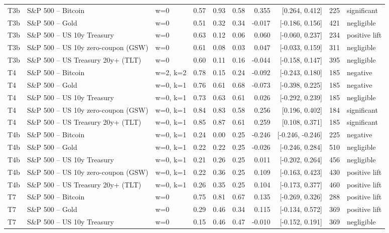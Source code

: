 \begin{figure}
\begin{tabular}{lllrrrrrrl}
T3b & S\&P 500 -- Bitcoin & w=0 & 0.57 & 0.93 & 0.58 & 0.355 & [0.264, 0.412] & 225 & significant \\
T3b & S\&P 500 -- Gold & w=0 & 0.51 & 0.32 & 0.34 & -0.017 & [-0.186, 0.156] & 421 & negligible \\
T3b & S\&P 500 -- US 10y Treasury & w=0 & 0.63 & 0.12 & 0.06 & 0.060 & [-0.060, 0.237] & 234 & positive lift \\
T3b & S\&P 500 -- US 10y zero-coupon (GSW) & w=0 & 0.61 & 0.08 & 0.03 & 0.047 & [-0.033, 0.159] & 311 & negligible \\
T3b & S\&P 500 -- US Treasury 20y+ (TLT) & w=0 & 0.60 & 0.11 & 0.16 & -0.044 & [-0.158, 0.147] & 395 & negligible \\
T4 & S\&P 500 -- Bitcoin & w=2, k=2 & 0.78 & 0.15 & 0.24 & -0.092 & [-0.243, 0.180] & 185 & negative \\
T4 & S\&P 500 -- Gold & w=0, k=1 & 0.76 & 0.61 & 0.68 & -0.073 & [-0.398, 0.225] & 185 & negative \\
T4 & S\&P 500 -- US 10y Treasury & w=0, k=1 & 0.73 & 0.63 & 0.61 & 0.026 & [-0.292, 0.239] & 185 & negligible \\
T4 & S\&P 500 -- US 10y zero-coupon (GSW) & w=0, k=1 & 0.84 & 0.83 & 0.58 & 0.256 & [0.196, 0.402] & 184 & significant \\
T4 & S\&P 500 -- US Treasury 20y+ (TLT) & w=0, k=1 & 0.85 & 0.87 & 0.61 & 0.259 & [0.108, 0.371] & 185 & significant \\
T4b & S\&P 500 -- Bitcoin & w=0, k=1 & 0.24 & 0.00 & 0.25 & -0.246 & [-0.246, -0.246] & 225 & negative \\
T4b & S\&P 500 -- Gold & w=0, k=1 & 0.22 & 0.22 & 0.25 & -0.026 & [-0.246, 0.284] & 510 & negligible \\
T4b & S\&P 500 -- US 10y Treasury & w=0, k=1 & 0.21 & 0.26 & 0.25 & 0.011 & [-0.202, 0.264] & 456 & negligible \\
T4b & S\&P 500 -- US 10y zero-coupon (GSW) & w=0, k=1 & 0.22 & 0.36 & 0.25 & 0.109 & [-0.163, 0.423] & 430 & positive lift \\
T4b & S\&P 500 -- US Treasury 20y+ (TLT) & w=0, k=1 & 0.26 & 0.35 & 0.25 & 0.104 & [-0.173, 0.377] & 460 & positive lift \\
T7 & S\&P 500 -- Bitcoin & w=0 & 0.75 & 0.81 & 0.67 & 0.135 & [-0.269, 0.326] & 288 & positive lift \\
T7 & S\&P 500 -- Gold & w=0 & 0.29 & 0.46 & 0.34 & 0.115 & [-0.134, 0.572] & 369 & positive lift \\
T7 & S\&P 500 -- US 10y Treasury & w=0 & 0.15 & 0.46 & 0.47 & -0.010 & [-0.152, 0.191] & 369 & negligible \\

\end{tabular}
\end{figure}
